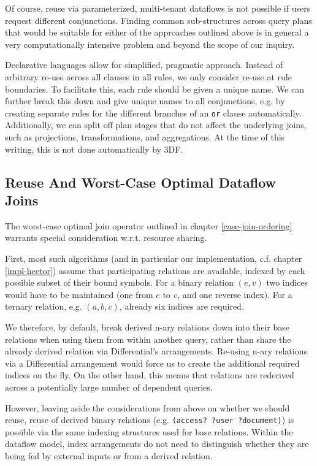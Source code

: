 \documentclass[../catalog.tex]{subfiles}
\begin{document}
Of course, reuse via parameterized, multi-tenant dataflows is not
possible if users request different conjunctions. Finding common
sub-structures across query plans that would be suitable for either of
the approaches outlined above is in general a very computationally
intensive problem and beyond the scope of our inquiry.

Declarative languages allow for simplified, pragmatic
approach. Instead of arbitrary re-use across all clauses in all rules,
we only consider re-use at rule boundaries. To facilitate this, each
rule should be given a unique name. We can further break this down and
give unique names to all conjunctions, e.g. by creating separate rules
for the different branches of an \texttt{or} clause
automatically. Additionally, we can split off plan stages that do not
affect the underlying joins, such as projections, transformations, and
aggregations. At the time of this writing, this is not done
automatically by 3DF.

\subsection{Reuse And Worst-Case Optimal Dataflow Joins}

The worst-case optimal join operator outlined in chapter
\ref{case-join-ordering} warrants special consideration
w.r.t. resource sharing.

First, most such algorithms (and in particular our implementation,
c.f. chapter \ref{impl-hector}) assume that participating relations
are available, indexed by each possible subset of their bound
symbols. For a binary relation $(e,v)$ two indices would have to be
maintained (one from $e$ to $v$, and one reverse index). For a ternary
relation, e.g. $(a,b,c)$, already six indices are required.

We therefore, by default, break derived n-ary relations down into
their base relations when using them from within another query, rather
than share the already derived relation via Differential's
arrangements. Re-using n-ary relations via a Differential arrangement
would force us to create the additional required indices on the
fly. On the other hand, this means that relations are rederived across
a potentially large number of dependent queries.

However, leaving aside the considerations from above on whether we
should reuse, reuse of derived binary relations (e.g. \texttt{(access?
  ?user ?document)}) is possible via the same indexing structures used
for base relations. Within the dataflow model, index arrangements do
not need to distinguish whether they are being fed by external inputs
or from a derived relation.
\end{document}
